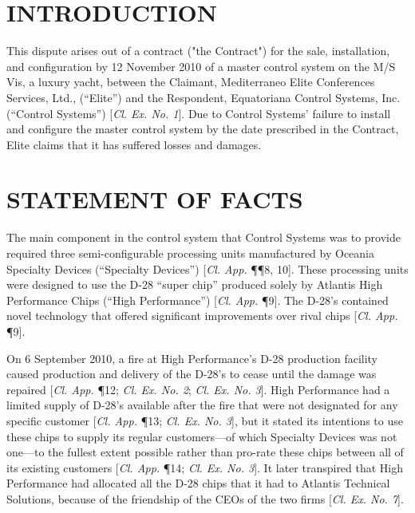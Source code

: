 \newpage

\mainmatter

\section{INTRODUCTION}

This dispute arises out of a contract ("the Contract") for the sale, installation, and configuration by 12 November 2010 of a master control system on the M/S Vis, a luxury yacht, between the Claimant, Mediterraneo Elite Conferences Services, Ltd., (``Elite'') and the Respondent, Equatoriana Control Systems, Inc. (``Control Systems'') [\textit{Cl. Ex. No. 1}]. Due to Control Systems' failure to install and configure the master control system by the date prescribed in the Contract, Elite claims that it has suffered losses and damages. 

\section{STATEMENT OF FACTS}
 
The main component in the control system that Control Systems was to provide required three semi-configurable processing units manufactured by Oceania Specialty Devices (``Specialty Devices'') [\textit{Cl. App.} \P\P 8, 10]. These processing units were designed to use the D-28 ``super chip'' produced solely by Atlantis High Performance Chips (``High Performance'') [\textit{Cl. App.} \P 9]. The D-28's contained novel technology that offered significant improvements over rival chips [\textit{Cl. App.} \P 9]. 

On 6 September 2010, a fire at High Performance's D-28 production facility caused production and delivery of the D-28's to cease until the damage was repaired [\textit{Cl. App.} \P 12; \textit{Cl. Ex. No. 2}; \textit{Cl. Ex. No. 3}]. High Performance had a limited supply of D-28's available after the fire that were not designated for any specific customer [\textit{Cl. App.} \P 13; \textit{Cl. Ex. No. 3}], but it stated its intentions to use these chips to supply its regular customers---of which Specialty Devices was not one---to the fullest extent possible rather than pro-rate these chips between all of its existing customers [\textit{Cl. App.} \P 14; \textit{Cl. Ex. No. 3}]. It later transpired that High Performance had allocated all the D-28 chips that it had to Atlantis Technical Solutions, because of the friendship of the CEOs of the two firms [\textit{Cl. Ex. No. 7}].


